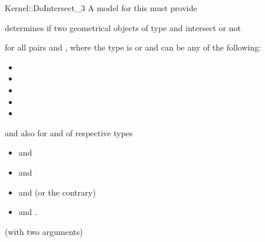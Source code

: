 \begin{ccRefFunctionObjectConcept}{Kernel::DoIntersect_3}
A model for this must provide


{determines if two geometrical objects of type 
 and  intersect or not}

for all pairs  and , where
the type  is  or
 and 
 can be any of the following:
\begin{itemize}
\item {}
\item {}
\item {}
\item {}
\item {}
\end{itemize}
and also for  and  of respective types
\begin{itemize}
\item {} and 
\item {} and 
\item {} and  (or the contrary)
\item {} and .
\end{itemize}

\ccRefines
{} (with two arguments)

\ccSeeAlso
{}\\

\end{ccRefFunctionObjectConcept}
